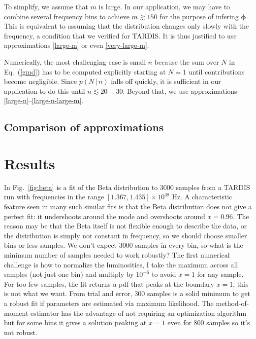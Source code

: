 \documentclass[11pt]{article}
\newcommand{\cond}{\,|\,}
\newcommand{\bmphi}{{\bm{\phi}}}
\newcommand{\refeq}[1]{Eq.~(\ref{#1})}
\newcommand{\reffig}[1]{Fig.~\ref{fig:#1}}
\begin{document}
To simplify, we assume that $m$ is large. In our application, we may
have to combine several frequency bins to achieve $m \gtrsim 150$ for
the purpose of infering $\bmphi$. This is equivalent to assuming that
the distribution changes only slowly with the frequency, a condition
that we verified for TARDIS. It is thus justified to use
approximations \ref{large-m} or even \ref{very-large-m}.

Numerically, the most challenging case is small $n$ because the sum
over $N$ in \refeq{gmd} has to be computed explicitly starting at
$N=1$ until contributions become negligible. Since $p(N \cond n)$
falls off quickly, it is sufficient in our application to do this
until $n \lesssim 20-30$. Beyond that, we use approximations
\ref{large-n}--\ref{large-n-large-m}.

\subsection*{Comparison of approximations}

\section{Results}

In \reffig{beta} is a fit of the Beta distribution to 3000
samples from a TARDIS run with frequencies in the range $[1.367,
1.435] \times 10^{38}$ Hz. A characteristic feature seen in many such
similar fits is that the Beta distribution does not give a perfect
fit: it undershoots around the mode and overshoots around
$x=0.96$. The reason may be that the Beta itself is not flexible
enough to describe the data, or the distribution is simply not
constant in frequency, so we should choose smaller bins or less
samples. We don't expect 3000 samples in every bin, so what is the
minimum number of samples needed to work robustly? The first numerical
challenge is how to normalize the luminosities, I take the maximum
across all samples (not just one bin) and multiply by $10^{-6}$ to
avoid $x=1$ for any sample. For too few samples, the fit returns a pdf
that peaks at the boundary $x=1$, this is not what we want. From trial
and error, 300 samples is a solid minimum to get a robust fit if
parameters are estimated via maximum likelihood. The method-of-moment
estimator has the advantage of not requiring an optimization algorithm
but for some bins it gives a solution peaking at $x=1$ even for 800
samples so it's not robust.
\end{document}
